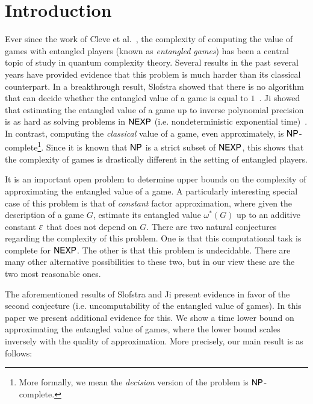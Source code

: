 \section{Introduction}

Ever since the work of Cleve et al.~\cite{cleve2004consequences}, the complexity of computing the value of games with entangled players (known as \emph{entangled games}) has been a central topic of study in quantum complexity theory. Several results in the past several years have provided evidence that this problem is much harder than its classical counterpart. In a breakthrough result, Slofstra showed that there is no algorithm that can decide whether the entangled value of a game is equal to $1$~\cite{slofstra2017set}. Ji showed that estimating the entangled value of a game up to inverse polynomial precision is as hard as solving problems in ${\sf NEXP}$ (i.e. nondeterministic exponential time)~\cite{ji2016compression}. In contrast, computing the \emph{classical} value of a game, even approximately, is ${\sf NP}$-complete\footnote{More formally, we mean the \emph{decision} version of the problem is ${\sf NP}$-complete.}. Since it is known that ${\sf NP}$ is a strict subset of ${\sf NEXP}$, this shows that the complexity of games is drastically different in the setting of entangled players. 

It is an important open problem to determine upper bounds on the complexity of approximating the entangled value of a game. A particularly interesting special case of this problem is that of \emph{constant} factor approximation, where given the description of a game $G$, estimate its entangled value $\omega^*(G)$ up to an additive constant $\varepsilon$ that does not depend on $G$. There are two natural conjectures regarding the complexity of this problem. One is that this computational task is complete for ${\sf NEXP}$. The other is that this problem is undecidable. There are many other alternative possibilities to these two, but in our view these are the two most reasonable ones. 

The aforementioned results of Slofstra and Ji present evidence in favor of the second conjecture (i.e. uncomputability of the entangled value of games). In this paper we present additional evidence for this. We show a time lower bound on approximating the entangled value of games, where the lower bound scales inversely with the quality of approximation. More precisely, our main result is as follows:

